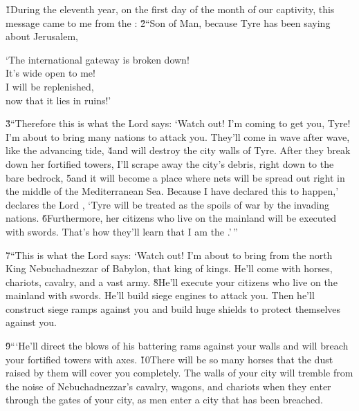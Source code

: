 \v{1}During the eleventh year, on the first day of the month of our captivity, this message came to me from the : \v{2}``Son of Man, because Tyre has been saying about Jerusalem,

\begin{poetry}
\poeml `The international gateway is broken down! \\
\poemll    It's wide open to me! \\
\poeml I will be replenished, \\
\poemll    now that it lies in ruins!'
\end{poetry}

\v{3}``Therefore this is what the Lord  says: `Watch out! I'm coming to get you, Tyre! I'm about to bring many nations to attack you. They'll come in wave after wave, like the advancing tide, \v{4}and will destroy the city walls of Tyre. After they break down her fortified towers, I'll scrape away the city's debris, right down to the bare bedrock, \v{5}and it will become a place where nets will be spread out right in the middle of the Mediterranean Sea. Because I have declared this to happen,' declares the Lord , `Tyre will be treated as the spoils of war by the invading nations. \v{6}Furthermore, her citizens who live on the mainland will be executed with swords. That's how they'll learn that I am the .'\,''

\v{7}``This is what the Lord  says: `Watch out! I'm about to bring from the north King Nebuchadnezzar of Babylon, that king of kings. He'll come with horses, chariots, cavalry, and a vast army. \v{8}He'll execute your citizens who live on the mainland with swords. He'll build siege engines to attack you. Then he'll construct siege ramps against you and build huge shields to protect themselves against you.

\v{9}```He'll direct the blows of his battering rams against your walls and will breach your fortified towers with axes. \v{10}There will be so many horses that the dust raised by them will cover you completely. The walls of your city will tremble from the noise of Nebuchadnezzar's cavalry, wagons, and chariots when they enter through the gates of your city, as men enter a city that has been breached.

